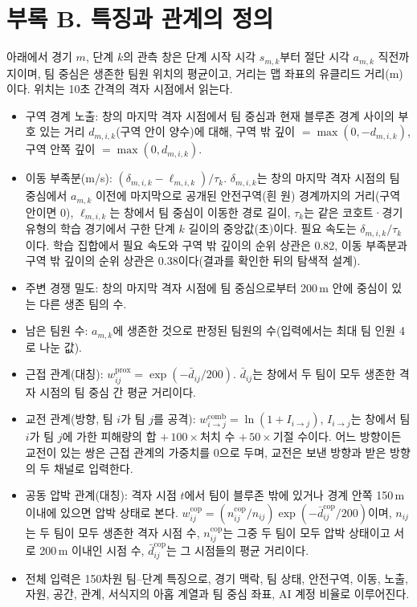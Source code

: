 \section*{부록 B. 특징과 관계의 정의}
아래에서 경기 $m$, 단계 $k$의 관측 창은 단계 시작 시각 $s_{m,k}$부터 절단 시각 $a_{m,k}$ 직전까지이며, 팀 중심은 생존한 팀원 위치의 평균이고, 거리는 맵 좌표의 유클리드 거리(m)이다. 위치는 10초 간격의 격자 시점에서 읽는다.
\begin{itemize}
\item 구역 경계 노출: 창의 마지막 격자 시점에서 팀 중심과 현재 블루존 경계 사이의 부호 있는 거리 $d_{m,i,k}$(구역 안이 양수)에 대해, 구역 밖 깊이 $=\max(0,-d_{m,i,k})$, 구역 안쪽 깊이 $=\max(0,d_{m,i,k})$.
\item 이동 부족분(m/s): $(\delta_{m,i,k}-\ell_{m,i,k})/\tau_{k}$. $\delta_{m,i,k}$는 창의 마지막 격자 시점의 팀 중심에서 $a_{m,k}$ 이전에 마지막으로 공개된 안전구역(흰 원) 경계까지의 거리(구역 안이면 0), $\ell_{m,i,k}$는 창에서 팀 중심이 이동한 경로 길이, $\tau_{k}$는 같은 코호트·경기 유형의 학습 경기에서 구한 단계 $k$ 길이의 중앙값(초)이다. 필요 속도는 $\delta_{m,i,k}/\tau_k$이다. 학습 집합에서 필요 속도와 구역 밖 깊이의 순위 상관은 0.82, 이동 부족분과 구역 밖 깊이의 순위 상관은 0.38이다(결과를 확인한 뒤의 탐색적 설계).
\item 주변 경쟁 밀도: 창의 마지막 격자 시점에 팀 중심으로부터 200\,m 안에 중심이 있는 다른 생존 팀의 수.
\item 남은 팀원 수: $a_{m,k}$에 생존한 것으로 판정된 팀원의 수(입력에서는 최대 팀 인원 4로 나눈 값).
\item 근접 관계(대칭): $w^{\mathrm{prox}}_{ij}=\exp(-\bar d_{ij}/200)$. $\bar d_{ij}$는 창에서 두 팀이 모두 생존한 격자 시점의 팀 중심 간 평균 거리이다.
\item 교전 관계(방향, 팀 $i$가 팀 $j$를 공격): $w^{\mathrm{comb}}_{i\to j}=\ln(1+I_{i\to j})$, $I_{i\to j}$는 창에서 팀 $i$가 팀 $j$에 가한 피해량의 합 $+\,100\times$처치 수 $+\,50\times$기절 수이다. 어느 방향이든 교전이 있는 쌍은 근접 관계의 가중치를 0으로 두며, 교전은 보낸 방향과 받은 방향의 두 채널로 입력한다.
\item 공동 압박 관계(대칭): 격자 시점 $t$에서 팀이 블루존 밖에 있거나 경계 안쪽 150\,m 이내에 있으면 압박 상태로 본다. $w^{\mathrm{cop}}_{ij}=(n^{\mathrm{cop}}_{ij}/n_{ij})\exp(-\bar d^{\mathrm{cop}}_{ij}/200)$이며, $n_{ij}$는 두 팀이 모두 생존한 격자 시점 수, $n^{\mathrm{cop}}_{ij}$는 그중 두 팀이 모두 압박 상태이고 서로 200\,m 이내인 시점 수, $\bar d^{\mathrm{cop}}_{ij}$는 그 시점들의 평균 거리이다.
\item 전체 입력은 150차원 팀--단계 특징으로, 경기 맥락, 팀 상태, 안전구역, 이동, 노출, 자원, 공간, 관계, 서식지의 아홉 계열과 팀 중심 좌표, AI 계정 비율로 이루어진다.
\end{itemize}

